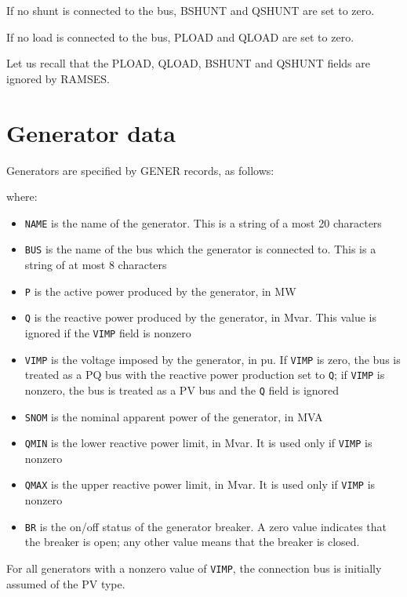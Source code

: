 If no shunt is connected to the bus, BSHUNT and QSHUNT are set to zero.

If no load is connected to the bus, PLOAD and QLOAD are set to zero.

Let us recall that the PLOAD, QLOAD, BSHUNT and QSHUNT fields are ignored by RAMSES.


\section{Generator data}

Generators are specified by GENER records, as follows:

\hspace*{5ex}{\tt GENER NAME BUS P Q VIMP SNOM QMIN QMAX BR ;}

where:
\begin{itemize}
\item {\tt NAME} is the name of the generator. This is a string of a most 20 characters
\item {\tt BUS} is the name of the bus which the generator is connected to. This is a string of at most 8 characters
\item {\tt P} is the  active power produced by the generator, in MW
\item {\tt Q} is the reactive power produced by the generator, in Mvar. This value is ignored if the {\tt VIMP} field is nonzero
\item {\tt VIMP} is the voltage imposed by the generator, in pu. If {\tt VIMP} is zero, the bus is
treated as a PQ bus with the reactive power production set to {\tt Q}; if {\tt VIMP} is nonzero, the bus is treated as a PV bus and the {\tt Q} field is ignored
\item {\tt SNOM} is the nominal apparent power of the generator, in MVA
\item {\tt QMIN} is the lower reactive power limit, in Mvar. It is used only if {\tt VIMP} is nonzero
\item {\tt QMAX} is the upper reactive power limit, in Mvar. It is used only if {\tt VIMP} is nonzero
\item {\tt BR} is the on/off status of the generator breaker. A zero value indicates that the
breaker is open; any other value means that the breaker is closed.
\end{itemize}

For all generators with a nonzero value of {\tt VIMP}, the connection bus is initially assumed of the PV type.

